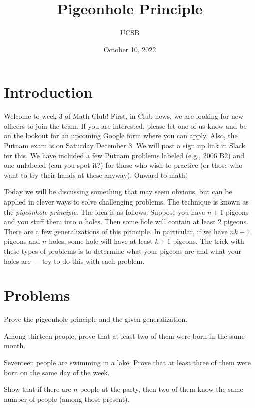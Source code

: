 \documentclass{article}
\title{Pigeonhole Principle}
\author{UCSB}
\date{October 10, 2022}
\begin{document}
\section{Introduction}

Welcome to week 3 of Math Club!
First, in Club news, we are looking for new officers to join the team.
If you are interested, please let one of us know and be on the lookout for an upcoming Google form where you can apply.
Also, the Putnam exam is on Saturday December 3.
We will post a sign up link in Slack for this.
We have included a few Putnam problems labeled (e.g., 2006 B2) and one unlabeled (can you spot it?) for those who wish to practice (or those who want to try their hands at these anyway).
Onward to math!

Today we will be discussing something that may seem obvious, but can be applied in clever ways to solve challenging problems.
The technique is known as the \textit{pigeonhole principle}.
The idea is as follows: Suppose you have \(n+1\) pigeons and you stuff them into \(n\) holes.
Then some hole will contain at least 2 pigeons.
There are a few generalizations of this principle.
In particular, if we have \(nk+1\) pigeons and \(n\) holes, some hole will have at least \(k+1\) pigeons.
The trick with these types of problems is to determine what your pigeons are and what your holes are --- try to do this with each problem.

\section{Problems}

\begin{exercise}
    Prove the pigeonhole principle and the given generalization.
\end{exercise}

\begin{exercise}
    Among thirteen people, prove that at least two of them were born in the same month.
\end{exercise}

\begin{exercise}
    Seventeen people are swimming in a lake.
    Prove that at least three of them were born on the same day of the week.
\end{exercise}

\begin{exercise}
    Show that if there are \(n\) people at the party, then two of them know the same number of people (among those present).
\end{exercise}
\end{document}
